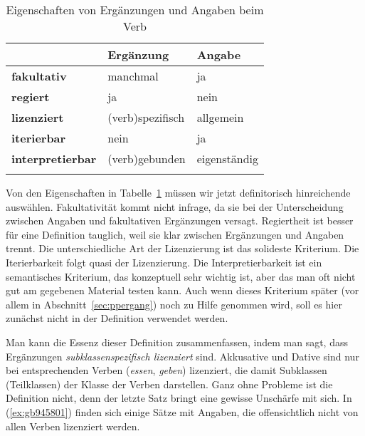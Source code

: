 \begin{table}[!htbp]
  \centering
  \begin{tabular}{lll}
    \lsptoprule
    & \textbf{Ergänzung} & \textbf{Angabe} \\
    \midrule
    \textbf{fakultativ} & manchmal & ja \\
    \textbf{regiert} & ja & nein \\
    \textbf{lizenziert} & (verb)spezifisch & allgemein \\
    \textbf{iterierbar} & nein & ja \\
    \textbf{interpretierbar} & (verb)gebunden & eigenständig \\
    \lspbottomrule
  \end{tabular}
  \caption{Eigenschaften von Ergänzungen und Angaben beim Verb}
  \label{tab:ergang}
\end{table}

Von den Eigenschaften in Tabelle~\ref{tab:ergang} müssen wir jetzt definitorisch hinreichende auswählen.
Fakultativität kommt nicht infrage, da sie bei der Unterscheidung zwischen Angaben und fakultativen Ergänzungen versagt.
Regiertheit ist besser für eine Definition tauglich, weil sie klar zwischen Ergänzungen und Angaben trennt.
Die unterschiedliche Art der Lizenzierung ist das solideste Kriterium.
Die Iterierbarkeit folgt quasi der Lizenzierung.
Die Interpretierbarkeit ist ein semantisches Kriterium, das konzeptuell sehr wichtig ist, aber das man oft nicht gut am gegebenen Material testen kann.
Auch wenn dieses Kriterium später (vor allem in Abschnitt~\ref{sec:ppergang}) noch zu Hilfe genommen wird, soll es hier zunächst nicht in der Definition verwendet werden.


Man kann die Essenz dieser Definition zusammenfassen, indem man sagt, dass Ergänzungen \textit{subklassenspezifisch lizenziert} sind.
Akkusative und Dative sind \zB nur bei entsprechenden Verben (\zB \textit{essen}, \textit{geben}) lizenziert, die damit Subklassen (Teilklassen) der Klasse der Verben darstellen.
Ganz ohne Probleme ist die Definition nicht, denn der letzte Satz bringt eine gewisse Unschärfe mit sich.
In (\ref{ex:gb945801}) finden sich einige Sätze mit Angaben, die offensichtlich nicht von allen Verben lizenziert werden.

